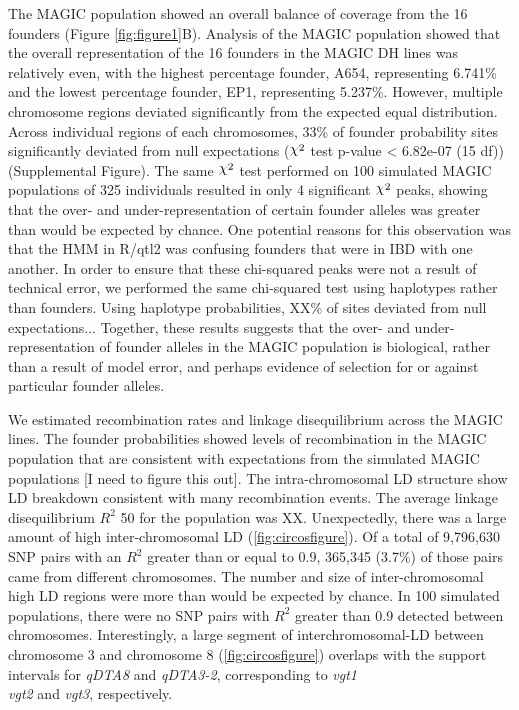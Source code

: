 \documentclass[article,9pt,twocolumn,twoside]{rilabRxiv}
\DeclareRobustCommand{\rchi}{{\mathpalette\irchi\relax}}
\newcommand{\irchi}[2]{\raisebox{\depth}{$#1\chi$}} %
\begin{document}
The MAGIC population showed an overall balance of coverage from the 16 founders (Figure \ref{fig:figure1}B).
Analysis of the MAGIC population showed that the overall representation of the 16 founders in the MAGIC DH lines was relatively even, with the highest percentage founder, A654, representing 6.741\% and the lowest percentage founder, EP1, representing 5.237\%.
However, multiple chromosome regions deviated significantly from the expected equal distribution.
Across individual regions of each chromosomes, 33\% of founder probability sites significantly deviated from null expectations ($\rchi^2$ test p-value < 6.82e-07 (15 df)) (Supplemental Figure).
The same $\rchi^2$ test performed on 100 simulated MAGIC populations of 325 individuals resulted in only 4 significant $\rchi^2$ peaks, showing that the over- and under-representation of certain founder alleles was greater than would be expected by chance.
One potential reasons for this observation was that the HMM in R/qtl2 was confusing founders that were in IBD with one another.
In order to ensure that these chi-squared peaks were not a result of technical error, we performed the same chi-squared test using haplotypes rather than founders.
Using haplotype probabilities, XX\% of sites deviated from null expectations...
Together, these results suggests that the over- and under-representation of founder alleles in the MAGIC population is biological, rather than a result of model error, and perhaps evidence of selection for or against particular founder alleles.

We estimated recombination rates and linkage disequilibrium across the MAGIC lines.
The founder probabilities showed levels of recombination in the MAGIC population that are consistent with expectations from the simulated MAGIC populations [I need to figure this out].
The intra-chromosomal LD structure show LD breakdown consistent with many recombination events.
The average linkage disequilibrium $R^2$ 50 for the population was XX.
Unexpectedly, there was a large amount of high inter-chromosomal LD (\ref{fig:circosfigure}).
Of a total of 9,796,630 SNP pairs with an $R^2$ greater than or equal to 0.9, 365,345 (3.7\%) of those pairs came from different chromosomes.
The number and size of inter-chromosomal high LD regions were more than would be expected by chance. In 100 simulated populations, there were no SNP pairs with $R^2$ greater than 0.9 detected between chromosomes.
Interestingly, a large segment of interchromosomal-LD between chromosome 3 and chromosome 8 (\ref{fig:circosfigure}) overlaps with the support intervals for \emph{qDTA8} and \emph{qDTA3-2}, corresponding to \emph{vgt1}\\ \emph{vgt2} and \emph{vgt3}, respectively.
\end{document}
